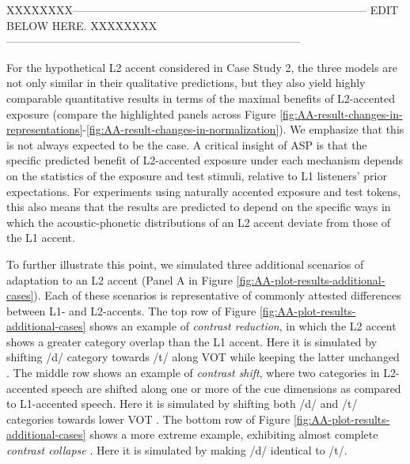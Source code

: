 \documentclass[
  11pt,
  man,floatsintext]{apa6}
\begin{document}
XXXXXXXX--------------------------------------------------------------------------------
EDIT BELOW HERE.
XXXXXXXX--------------------------------------------------------------------------------

For the hypothetical L2 accent considered in Case Study 2, the three models are not only similar in their qualitative predictions, but they also yield highly comparable quantitative results in terms of the maximal benefits of L2-accented exposure (compare the highlighted panels across Figure \ref{fig:AA-result-changes-in-representations}-\ref{fig:AA-result-changes-in-normalization}). We emphasize that this is not always expected to be the case. A critical insight of ASP is that the specific predicted benefit of L2-accented exposure under each mechanism depends on the statistics of the exposure and test stimuli, relative to L1 listeners' prior expectations. For experiments using naturally accented exposure and test tokens, this also means that the results are predicted to depend on the specific ways in which the acoustic-phonetic distributions of an L2 accent deviate from those of the L1 accent.

To further illustrate this point, we simulated three additional scenarios of adaptation to an L2 accent (Panel A in Figure \ref{fig:AA-plot-results-additional-cases}). Each of these scenarios is representative of commonly attested differences between L1- and L2-accents. The top row of Figure \ref{fig:AA-plot-results-additional-cases} shows an example of \emph{contrast reduction}, in which the L2 accent shows a greater category overlap than the L1 accent. Here it is simulated by shifting /d/ category towards /t/ along VOT while keeping the latter unchanged \autocite[as qualitatively attested for, e.g., vowels in Spanish-accented English,][]{wade2007}. The middle row shows an example of \emph{contrast shift}, where two categories in L2-accented speech are shifted along one or more of the cue dimensions as compared to L1-accented speech. Here it is simulated by shifting both /d/ and /t/ categories towards lower VOT \autocite[qualitatively attested for, e.g., word-initial stops in French-accented English,][]{Sumner2011a}. The bottom row of Figure \ref{fig:AA-plot-results-additional-cases} shows a more extreme example, exhibiting almost complete \emph{contrast collapse} \autocite[similar to the loss of the {[}s{]}-{[}\ipatext{θ}{]} contrast that can occur in Mandarin-accented English,][]{zheng-samuel2020}. Here it is simulated by making /d/ identical to /t/.
\end{document}
